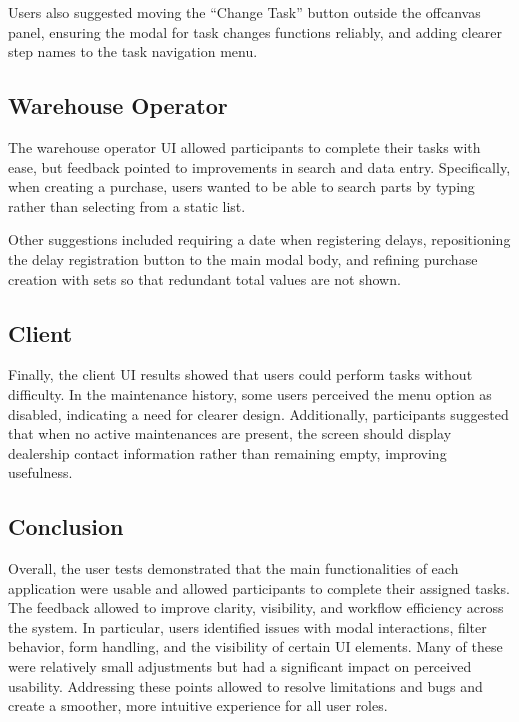 Users also suggested moving the “Change Task” button outside the offcanvas panel, ensuring the modal for task changes functions reliably, and adding clearer step names to the task navigation menu.

\subsection{Warehouse Operator}

The warehouse operator \ac{UI} allowed participants to complete their tasks with ease, but feedback pointed to improvements in search and data entry. Specifically, when creating a purchase, users wanted to be able to search parts by typing rather than selecting from a static list.

Other suggestions included requiring a date when registering delays, repositioning the delay registration button to the main modal body, and refining purchase creation with sets so that redundant total values are not shown.

\subsection{Client}

Finally, the client \ac{UI} results showed that users could perform tasks without difficulty. 
In the maintenance history, some users perceived the menu option as disabled, indicating a need for clearer design. Additionally, participants suggested that when no active maintenances are present, the screen should display dealership contact information rather than remaining empty, improving usefulness.


\subsection{Conclusion}

Overall, the user tests demonstrated that the main functionalities of each application were usable and allowed participants to complete their assigned tasks. The feedback allowed to improve clarity, visibility, and workflow efficiency across the system. In particular, users identified issues with modal interactions, filter behavior, form handling, and the visibility of certain \ac{UI} elements. Many of these were relatively small adjustments but had a significant impact on perceived usability. Addressing these points allowed to resolve  limitations and bugs and create a smoother, more intuitive experience for all user roles.

